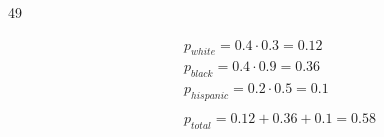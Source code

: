 \documentclass[letterpaper, landscape]{exam}
\begin{document}
\begin{description}





    \item[49]

      \begin{align*}
        p_{white} = 0.4 \cdot 0.3 = 0.12 \\
        p_{black} = 0.4 \cdot 0.9 = 0.36 \\
        p_{hispanic} = 0.2 \cdot 0.5 = 0.1 \\
        \\
        p_{total} = 0.12 + 0.36 + 0.1 = \boxed{ 0.58 } \\
      \end{align*}




\end{description}
\end{document}
